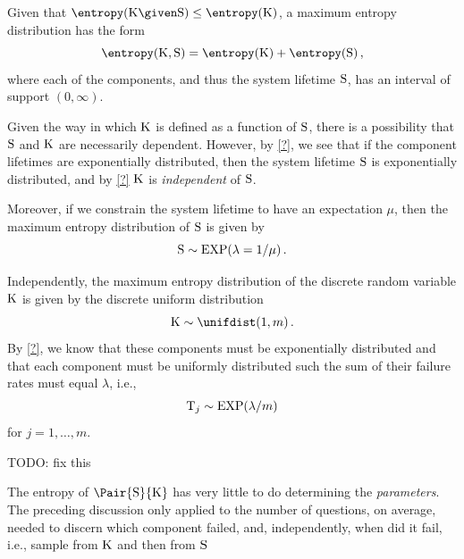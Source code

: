 \documentclass[../main.tex]{subfiles}
\begin{document}
Given that $\entropy(\RV{K} \given \sv) \leq \entropy(\RV{K})$, a maximum entropy distribution has the form
\begin{equation}
\entropy(\RV{K}, \sv) = \entropy(\RV{K}) + \entropy(\sv)\,,
\end{equation}
where each of the components, and thus the system lifetime $\mathrm{S}$, has an interval of support $(0,\infty)$.

Given the way in which $\mathrm{K}$ is defined as a function of $\mathrm{S}$, there is a possibility that $\mathrm{S}$ and $\mathrm{K}$ are necessarily dependent.
However, by \cref{?}, we see that if the component lifetimes are exponentially distributed, then the system lifetime $\mathrm{S}$ is exponentially distributed, and by \cref{?} $\mathrm{K}$ is \emph{independent} of $\mathrm{S}$.

Moreover, if we constrain the system lifetime to have an expectation $\mu$, then the maximum entropy distribution of $\mathrm{S}$ is given by
\begin{equation}
\mathrm{S} \sim \mathrm{EXP}(\lambda = 1 / \mu)\,.
\end{equation}

Independently, the maximum entropy distribution of the discrete random variable $\mathrm{K}$ is given by the discrete uniform distribution
\begin{equation}
\RV{K} \sim \unifdist(1,m)\,.
\end{equation}
By \cref{?}, we know that these components must be exponentially distributed and that each component must be uniformly distributed such the sum of their failure rates must equal $\lambda$, i.e.,
\begin{equation}
\mathrm{T}_j \sim \mathrm{EXP}(\lambda / m)
\end{equation}
for $j=1,\ldots,m$.

TODO: fix this

The entropy of $\Pair{\sv}{\RV{K}}$ has very little to do determining the \emph{parameters}. The preceding discussion only applied to the number of questions, on average, needed to discern which component failed, and, independently, when did it fail, i.e., sample from $\mathrm{K}$ and then from $\mathrm{S}$

\end{document}
